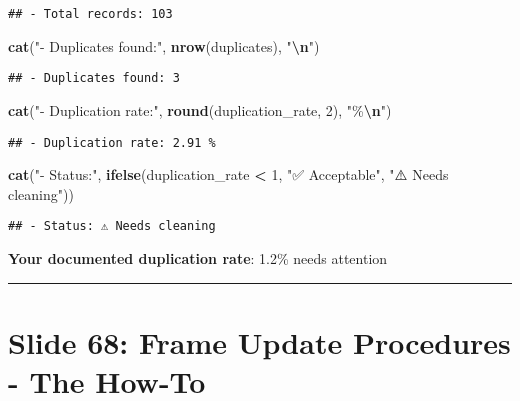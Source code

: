 \documentclass[
]{article}
\newenvironment{Shaded}{\begin{snugshade}}{\end{snugshade}}
\newcommand{\DecValTok}[1]{\textcolor[rgb]{0.00,0.00,0.81}{#1}}
\newcommand{\FunctionTok}[1]{\textcolor[rgb]{0.13,0.29,0.53}{\textbf{#1}}}
\newcommand{\NormalTok}[1]{#1}
\newcommand{\SpecialCharTok}[1]{\textcolor[rgb]{0.81,0.36,0.00}{\textbf{#1}}}
\newcommand{\StringTok}[1]{\textcolor[rgb]{0.31,0.60,0.02}{#1}}
\begin{document}
\begin{verbatim}
## - Total records: 103
\end{verbatim}

\begin{Shaded}
\begin{Highlighting}[]
\FunctionTok{cat}\NormalTok{(}\StringTok{"{-} Duplicates found:"}\NormalTok{, }\FunctionTok{nrow}\NormalTok{(duplicates), }\StringTok{"}\SpecialCharTok{\textbackslash{}n}\StringTok{"}\NormalTok{)}
\end{Highlighting}
\end{Shaded}

\begin{verbatim}
## - Duplicates found: 3
\end{verbatim}

\begin{Shaded}
\begin{Highlighting}[]
\FunctionTok{cat}\NormalTok{(}\StringTok{"{-} Duplication rate:"}\NormalTok{, }\FunctionTok{round}\NormalTok{(duplication\_rate, }\DecValTok{2}\NormalTok{), }\StringTok{"\%}\SpecialCharTok{\textbackslash{}n}\StringTok{"}\NormalTok{)}
\end{Highlighting}
\end{Shaded}

\begin{verbatim}
## - Duplication rate: 2.91 %
\end{verbatim}

\begin{Shaded}
\begin{Highlighting}[]
\FunctionTok{cat}\NormalTok{(}\StringTok{"{-} Status:"}\NormalTok{, }\FunctionTok{ifelse}\NormalTok{(duplication\_rate }\SpecialCharTok{\textless{}} \DecValTok{1}\NormalTok{, }\StringTok{"✅ Acceptable"}\NormalTok{, }
                       \StringTok{"⚠️ Needs cleaning"}\NormalTok{))}
\end{Highlighting}
\end{Shaded}

\begin{verbatim}
## - Status: ⚠️ Needs cleaning
\end{verbatim}

\textbf{Your documented duplication rate}: 1.2\% needs attention

\begin{center}\rule{0.5\linewidth}{0.5pt}\end{center}

\section{Slide 68: Frame Update Procedures - The
How-To}\label{slide-68-frame-update-procedures---the-how-to}
\end{document}
